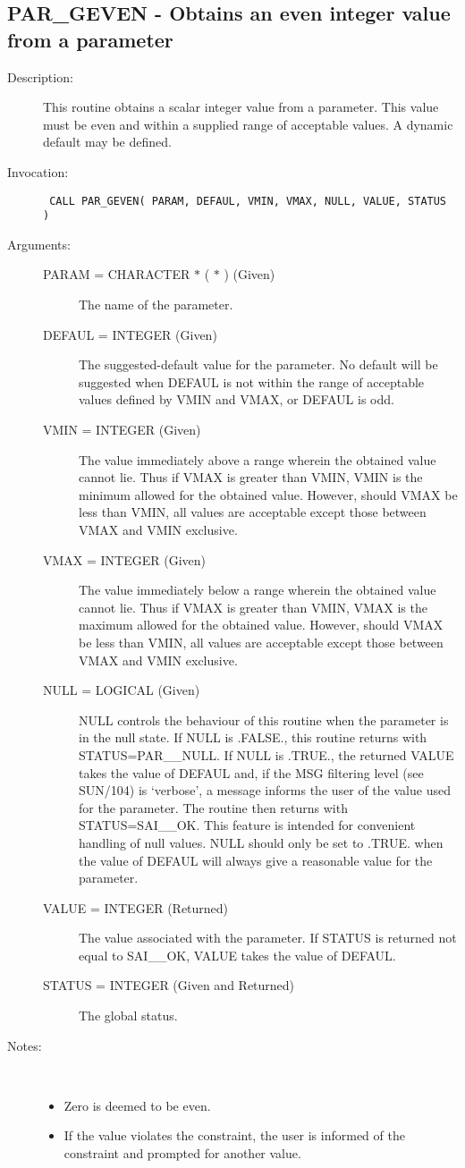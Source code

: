 \documentclass[twoside,11pt]{article}
\newcommand{\xref}[3]{#1}
\newcommand{\xlabel}[1]{}
\newcommand{\latex}[1]{#1}
\newlength{\sstbannerlength}
\newlength{\sstcaptionlength}
\newlength{\sstexampleslength}
\newlength{\sstexampleswidth}
\newcommand{\sstroutine}[3]{
   \goodbreak
   \rule{\textwidth}{0.5mm}
   \vspace{-7ex}
   \newline
   \settowidth{\sstbannerlength}{{\Large {\bf #1}}}
   \setlength{\sstcaptionlength}{\textwidth}
   \setlength{\sstexampleslength}{\textwidth}
   \addtolength{\sstbannerlength}{0.5em}
   \addtolength{\sstcaptionlength}{-2.0\sstbannerlength}
   \addtolength{\sstcaptionlength}{-5.0pt}
   \settowidth{\sstexampleswidth}{{\bf Examples:}}
   \addtolength{\sstexampleslength}{-\sstexampleswidth}
   \parbox[t]{\sstbannerlength}{\flushleft{\Large {\bf #1}}}
   \parbox[t]{\sstcaptionlength}{\center{\Large #2}}
   \parbox[t]{\sstbannerlength}{\flushright{\Large {\bf #1}}}
   \begin{description}
      #3
   \end{description}
}
\newcommand{\sstdescription}[1]{\item[Description:] #1}
\newcommand{\sstinvocation}[1]{\item[Invocation:]\hspace{0.4em}{\tt #1}}
\newcommand{\sstarguments}[1]{
   \item[Arguments:] \mbox{} \\
   \vspace{-3.5ex}
   \begin{description}
      #1
   \end{description}
}
\newcommand{\sstsubsection}[1]{ \item[{#1}] \mbox{} \\}
\newcommand{\sstnotes}[1]{\item[Notes:] \mbox{} \\[1.3ex] #1}
\newcommand{\sstitemlist}[1]{
  \mbox{} \\
  \vspace{-7ex}
  \begin{itemize}
     #1
  \end{itemize}
}
\newcommand{\sstitem}{\item}
\newcommand{\ssttt}{\tt}
\renewcommand{\sstroutine}[3]{
      \subsection{\xlabel{12}#1\xlabel{#1}-\label{#1}#2}
      \begin{description}
         #3
      \end{description}
   }
\renewcommand{\sstdescription}[1]{\item[Description:]
      \begin{description}
         #1
      \end{description}
   }
\renewcommand{\sstinvocation}[1]{\item[Invocation:]
      \begin{description}
         {\ssttt #1}
      \end{description}
   }
\renewcommand{\sstarguments}[1]{
      \item[Arguments:]
      \begin{description}
         #1
      \end{description}
   }
\renewcommand{\sstsubsection}[1]{\item[{#1}]}
\renewcommand{\sstnotes}[1]{\item[Notes:]
      \begin{description}
         #1
      \end{description}
   }
\newcommand{\sstitemlist}[1]{
      \begin{itemize}
         #1
      \end{itemize}
   }
\begin{document}
\sstroutine{
   PAR\_GEVEN
}{
   Obtains an even integer value from a parameter
}{
   \sstdescription{
      This routine obtains a scalar integer value from a parameter.
      This value must be even and within a supplied range of acceptable
      values.  A dynamic default may be defined.
   }
   \sstinvocation{
      CALL PAR\_GEVEN( PARAM, DEFAUL, VMIN, VMAX, NULL, VALUE, STATUS )
   }
   \sstarguments{
      \sstsubsection{
         PARAM = CHARACTER $*$ ( $*$ ) (Given)
      }{
         The name of the parameter.
      }
      \sstsubsection{
         DEFAUL = INTEGER (Given)
      }{
         The suggested-default value for the parameter.  No default
         will be suggested when DEFAUL is not within the range of
         acceptable values defined by VMIN and VMAX, or DEFAUL is odd.
      }
      \sstsubsection{
         VMIN = INTEGER (Given)
      }{
         The value immediately above a range wherein the obtained
         value cannot lie.  Thus if VMAX is greater than VMIN, VMIN
         is the minimum allowed for the obtained value.  However,
         should VMAX be less than VMIN, all values are acceptable
         except those between VMAX and VMIN exclusive.
      }
      \sstsubsection{
         VMAX = INTEGER (Given)
      }{
         The value immediately below a range wherein the obtained
         value cannot lie.  Thus if VMAX is greater than VMIN, VMAX
         is the maximum allowed for the obtained value.  However,
         should VMAX be less than VMIN, all values are acceptable
         except those between VMAX and VMIN exclusive.
      }
      \sstsubsection{
         NULL = LOGICAL (Given)
      }{
         NULL controls the behaviour of this routine when the parameter
         is in the null state.  If NULL is .FALSE., this routine
         returns with STATUS=PAR\_\_NULL.  If NULL is .TRUE., the
         returned VALUE takes the value of DEFAUL and, if the
\xref{MSG filtering level}{sun104}{conditional_message_reporting}
\latex{ (see SUN/104)} is `verbose',
         a message informs the user of the value used for
         the parameter. The routine then returns with STATUS=SAI\_\_OK. 
         This feature is intended for convenient handling of null values.
         NULL should only be set to .TRUE. when the value of DEFAUL will
         always give a reasonable value for the parameter.
      }
      \sstsubsection{
         VALUE  = INTEGER (Returned)
      }{
         The value associated with the parameter.  If STATUS is returned
         not equal to SAI\_\_OK, VALUE takes the value of DEFAUL.
      }
      \sstsubsection{
         STATUS = INTEGER (Given and Returned)
      }{
         The global status.
      }
   }
   \sstnotes{
      \sstitemlist{

         \sstitem
         Zero is deemed to be even.

         \sstitem
         If the value violates the constraint, the user is informed of
         the constraint and prompted for another value.
      }
   }
}
\end{document}
